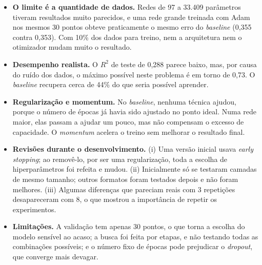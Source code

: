 \documentclass[11pt,a4paper]{article}
\begin{document}
\begin{itemize}
    \item \textbf{O limite é a quantidade de dados.} Redes de 97 a 33.409 parâmetros tiveram resultados muito parecidos, e uma rede grande treinada com Adam nos mesmos 30 pontos obteve praticamente o mesmo erro do \textit{baseline} (0,355 contra 0,353). Com 10\% dos dados para treino, nem a arquitetura nem o otimizador mudam muito o resultado.
    \item \textbf{Desempenho realista.} O $R^2$ de teste de 0,288 parece baixo, mas, por causa do ruído dos dados, o máximo possível neste problema é em torno de 0,73. O \textit{baseline} recupera cerca de 44\% do que seria possível aprender.
    \item \textbf{Regularização e momentum.} No \textit{baseline}, nenhuma técnica ajudou, porque o número de épocas já havia sido ajustado no ponto ideal. Numa rede maior, elas passam a ajudar um pouco, mas não compensam o excesso de capacidade. O \textit{momentum} acelera o treino sem melhorar o resultado final.
    \item \textbf{Revisões durante o desenvolvimento.} (i) Uma versão inicial usava \textit{early stopping}; ao removê-lo, por ser uma regularização, toda a escolha de hiperparâmetros foi refeita e mudou. (ii) Inicialmente só se testaram camadas de mesmo tamanho; outros formatos foram testados depois e não foram melhores. (iii) Algumas diferenças que pareciam reais com 3 repetições desapareceram com 8, o que mostrou a importância de repetir os experimentos.
    \item \textbf{Limitações.} A validação tem apenas 30 pontos, o que torna a escolha do modelo sensível ao acaso; a busca foi feita por etapas, e não testando todas as combinações possíveis; e o número fixo de épocas pode prejudicar o \textit{dropout}, que converge mais devagar.
\end{itemize}
\end{document}
